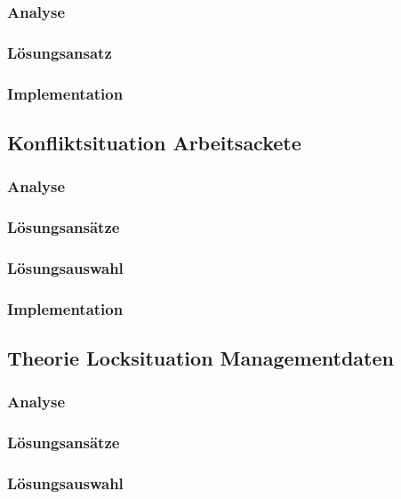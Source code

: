 \subsubsection{Analyse}


\subsubsection{L\"osungsansatz}

\subsubsection{Implementation}


\subsection{Konfliktsituation Arbeitsackete}
\subsubsection{Analyse}
\subsubsection{L\"osungsans\"atze}
\subsubsection{L\"osungsauswahl}

\subsubsection{Implementation}

\subsection{Theorie Locksituation Managementdaten}
\subsubsection{Analyse}
\subsubsection{L\"osungsans\"atze}
\subsubsection{L\"osungsauswahl}
